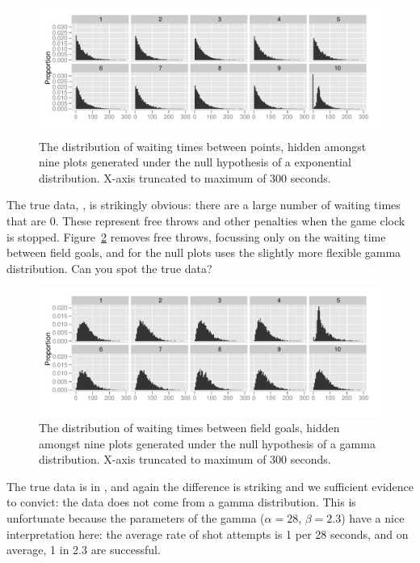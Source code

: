 \documentclass[oneside]{article}
\begin{document}
\begin{figure}[htbp]
  \centering
    \includegraphics[width=\linewidth]{exponential}
  \caption{The distribution of waiting times between points, hidden amongst nine plots generated under the null hypothesis of a exponential distribution. X-axis truncated to maximum of 300 seconds.}
  \label{fig:exponential}
\end{figure}

The true data, , is strikingly obvious: there are a large number of waiting times that are 0. These represent free throws and other penalties when the game clock is stopped. Figure~\ref{fig:gamma} removes free throws, focussing only on the waiting time between field goals, and for the null plots uses the slightly more flexible gamma distribution. Can you spot the true data?

\begin{figure}[htbp]
  \centering
    \includegraphics[width=\linewidth]{gamma}
  \caption{The distribution of waiting times between field goals, hidden amongst nine plots generated under the null hypothesis of a gamma distribution. X-axis truncated to maximum of 300 seconds.}
  \label{fig:gamma}
\end{figure}

The true data is in , and again the difference is striking and we sufficient evidence to convict: the data does not come from a gamma distribution. This is unfortunate because the parameters of the gamma ($\alpha = 28$, $\beta = 2.3$) have a nice interpretation here: the average rate of shot attempts is 1 per 28 seconds, and on average, 1 in 2.3 are successful.
\end{document}
